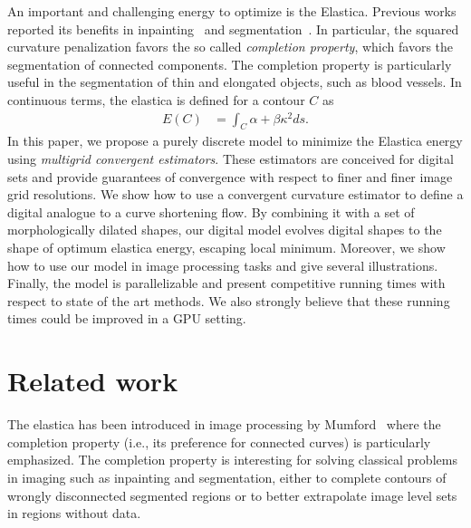 \documentclass[review]{siamart220329}
\begin{document}
An important and challenging energy to optimize is the Elastica. Previous works reported its benefits in inpainting~\cite{masnou98inpainting,ballester01filljoint,chan02elasticainpainting} and segmentation~\cite{goldluecke11totalcurvature,zhu2013image,nieuwenhuis14efficient, antunes20}. In particular, the squared curvature penalization favors the so called \emph{completion property}, which favors the segmentation of connected components. The completion property is particularly useful in the segmentation of thin and elongated objects, such as blood vessels. In continuous terms, the elastica is defined for a contour $C$ as
%
%
\begin{align*}
	E(C) &= \int_{C}{\alpha + \beta \kappa^2 ds}.
\end{align*}
%
%
In this paper, we propose a purely discrete model to minimize the Elastica energy using \emph{multigrid convergent estimators}. These estimators are conceived for digital sets and provide guarantees of convergence with respect to finer and finer image grid resolutions. We show how to use a convergent curvature estimator to define a  digital analogue to a curve shortening flow. By combining it with a set of morphologically dilated shapes, our digital model evolves digital shapes to the shape of optimum elastica energy, escaping local minimum. Moreover, we show how to use our model in image processing tasks and give several illustrations. Finally, the model is parallelizable and present competitive running times with respect to state of the art methods. We also strongly believe that these running times could be improved in a GPU setting.
%
%
\section{Related work}

The elastica has been introduced in image processing by Mumford~\cite{mumford1994elastica} 
where the completion property (i.e., its preference for connected curves) is 
particularly emphasized.
The completion property is interesting for solving classical 
problems in imaging such as inpainting and segmentation, either to complete contours of 
wrongly disconnected segmented regions or to better extrapolate image level sets in regions without data. 
\end{document}
